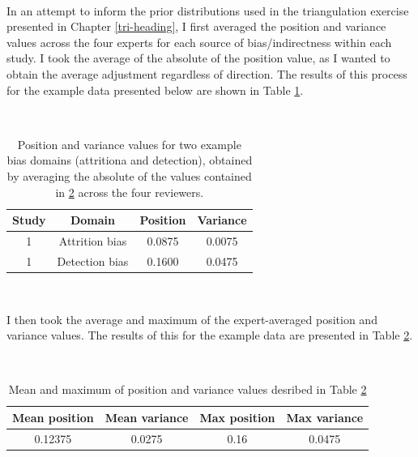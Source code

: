 \documentclass[a4paper, twoside]{templates/ociamthesis}
\begin{document}
~

In an attempt to inform the prior distributions used in the triangulation exercise presented in Chapter \ref{tri-heading}, I first averaged the position and variance values across the four experts for each source of bias/indirectness within each study. I took the average of the absolute of the position value, as I wanted to obtain the average adjustment regardless of direction. The results of this process for the example data presented below are shown in Table \ref{tab:addTable2-table}.

~\\




\begin{table}[H]

\caption[addTable1]{\label{tab:addTable2-table}Position and variance values for two example bias domains (attritiona and detection), obtained by averaging the absolute of the values contained in \ref{tab:addTable3-table} across the four reviewers.}
\centering
\begin{tabular}[t]{cccc}
\toprule
\textbf{Study} & \textbf{Domain} & \textbf{Position} & \textbf{Variance}\\
\midrule
1 & Attrition bias & 0.0875 & 0.0075\\
1 & Detection bias & 0.1600 & 0.0475\\
\bottomrule
\end{tabular}
\end{table}

~

I then took the average and maximum of the expert-averaged position and variance values. The results of this for the example data are presented in Table \ref{tab:addTable3-table}.

~\\




\begin{table}[H]

\caption[addTable1]{\label{tab:addTable3-table}Mean and maximum of position and variance values desribed in Table \ref{tab:addTable3-table}}
\centering
\begin{tabular}[t]{cccc}
\toprule
\textbf{Mean position} & \textbf{Mean variance} & \textbf{Max position} & \textbf{Max variance}\\
\midrule
0.12375 & 0.0275 & 0.16 & 0.0475\\
\bottomrule
\end{tabular}
\end{table}
\end{document}
